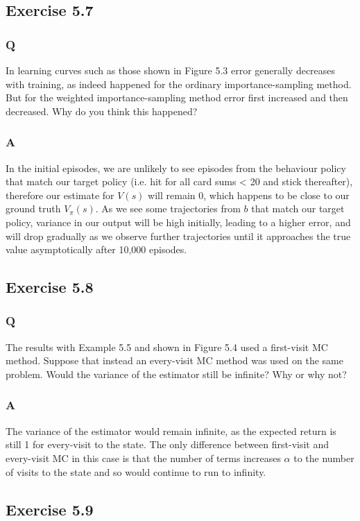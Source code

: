 \subsection*{Exercise 5.7}
\subsubsection{Q}
In learning curves such as those shown in Figure 5.3 error generally decreases with training, as indeed happened for the ordinary importance-sampling method. But for the weighted importance-sampling method error first increased and then decreased. Why do you think this happened?
\subsubsection{A}
In the initial episodes, we are unlikely to see episodes from the behaviour policy that match our target policy (i.e. hit for all card sums < 20 and stick thereafter), therefore our estimate for $V(s)$ will remain 0, which happens to be close to our ground truth $V_\pi(s)$. As we see some trajectories from $b$ that match our target policy, variance in our output will be high initially, leading to a higher error, and will drop gradually as we observe further trajectories until it approaches the true value asymptotically after 10,000 episodes.

\subsection*{Exercise 5.8}
\subsubsection{Q}
The results with Example 5.5 and shown in Figure 5.4 used a first-visit MC method. Suppose that instead an every-visit MC method was used on the same problem. Would the variance of the estimator still be infinite? Why or why not?
\subsubsection{A}
The variance of the estimator would remain infinite, as the expected return is still 1 for every-visit to the state. The only difference between first-visit and every-visit MC in this case is that the number of terms increases $\alpha$ to the number of visits to the state and so would continue to run to infinity.

\subsection*{Exercise 5.9}
